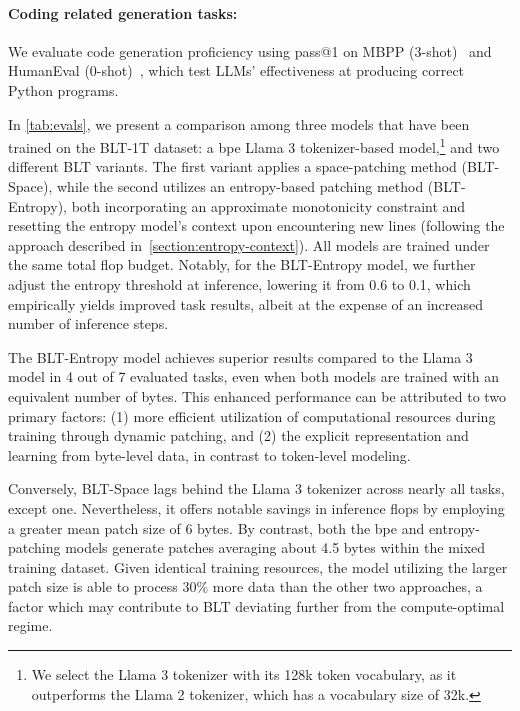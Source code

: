\paragraph{Coding related generation tasks:} We evaluate code generation proficiency using pass@1 on MBPP (3-shot)~\citep{Eval_MBPP} and HumanEval (0-shot)~\citep{Eval_HumanEval}, which test LLMs’ effectiveness at producing correct Python programs.

In \autoref{tab:evals}, we present a comparison among three models that have been trained on the {\textsc BLT}-1T dataset: a bpe Llama 3 tokenizer-based model,\footnote{We select the Llama 3 tokenizer with its 128k token vocabulary, as it outperforms the Llama 2 tokenizer, which has a vocabulary size of 32k.} and two different {\textsc BLT} variants. The first variant applies a space-patching method ({\textsc BLT}-Space), while the second utilizes an entropy-based patching method ({\textsc BLT}-Entropy), both incorporating an approximate monotonicity constraint and resetting the entropy model’s context upon encountering new lines (following the approach described in~\autoref{section:entropy-context}). All models are trained under the same total flop budget. Notably, for the {\textsc BLT}-Entropy model, we further adjust the entropy threshold at inference, lowering it from 0.6 to 0.1, which empirically yields improved task results, albeit at the expense of an increased number of inference steps.

The {\textsc BLT}-Entropy model achieves superior results compared to the Llama 3 model in 4 out of 7 evaluated tasks, even when both models are trained with an equivalent number of bytes. This enhanced performance can be attributed to two primary factors: (1) more efficient utilization of computational resources during training through dynamic patching, and (2) the explicit representation and learning from byte-level data, in contrast to token-level modeling.

Conversely, {\textsc BLT}-Space lags behind the Llama 3 tokenizer across nearly all tasks, except one. Nevertheless, it offers notable savings in inference flops by employing a greater mean patch size of 6 bytes. By contrast, both the bpe and entropy-patching models generate patches averaging about 4.5 bytes within the mixed training dataset. Given identical training resources, the model utilizing the larger patch size is able to process 30\% more data than the other two approaches, a factor which may contribute to {\textsc BLT} deviating further from the compute-optimal regime.


